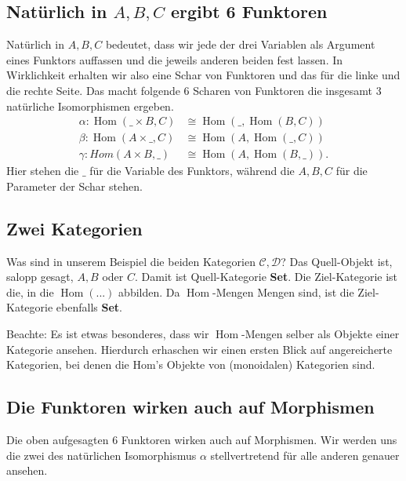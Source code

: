 \documentclass[a4paper]{amsart}
\theoremstyle{definition}
\DeclareMathOperator{\Hom}{Hom}
\begin{document}
\subsection{Natürlich in $A, B, C$ ergibt 6 Funktoren}
Natürlich in $A, B, C$ bedeutet, dass wir jede der drei Variablen als Argument eines Funktors auffassen und die jeweils anderen beiden fest lassen. In Wirklichkeit erhalten wir also eine Schar von Funktoren und das für die linke und die rechte Seite. Das macht folgende 6 Scharen von Funktoren die insgesamt 3 natürliche Isomorphismen ergeben. 
\begin{align}
   \alpha \colon \Hom( \_ \times B, C ) &\cong \Hom( \_, \Hom( B, C))\\
   \beta \colon \Hom( A \times \_, C ) &\cong \Hom( A, \Hom( \_, C))\\
   \gamma \colon Hom( A \times B, \_ ) &\cong \Hom( A, \Hom( B, \_)).
\end{align}
Hier stehen die $\_$ für die Variable des Funktors, während die $A, B, C$ für die Parameter der Schar stehen.

\subsection{Zwei Kategorien}
Was sind in unserem Beispiel die beiden Kategorien $\mathcal{C,D}$? Das Quell-Objekt ist, salopp gesagt, $A, B$ oder $C$. Damit ist Quell-Kategorie \textbf{Set}. Die Ziel-Kategorie ist die, in die $\Hom( ... )$ abbilden. Da $\Hom$-Mengen Mengen sind, ist die Ziel-Kategorie ebenfalls \textbf{Set}.

Beachte: Es ist etwas besonderes, dass wir $\Hom$-Mengen selber als Objekte einer Kategorie ansehen. Hierdurch erhaschen wir einen ersten Blick auf angereicherte Kategorien, bei denen die Hom's Objekte von (monoidalen) Kategorien sind.

\subsection{Die Funktoren wirken auch auf Morphismen}
Die oben aufgesagten 6 Funktoren wirken auch auf Morphismen. Wir werden uns die zwei des natürlichen Isomorphismus $\alpha$ stellvertretend für alle anderen genauer ansehen.
\end{document}
